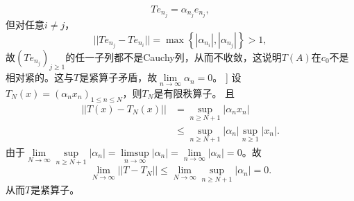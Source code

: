 \begin{enumerate}
\begin{answer}[]
      \[Te_{n_j}=\alpha_{n_j}e_{n_j},\]
      但对任意$i\not= j$，
      \[||Te_{n_j}-Te_{n_i}||=\max\left\{|\alpha_{n_i}|,|\alpha_{n_j}|\right\}>1,\]
      故$(Te_{n_j})_{j\geqslant1}$的任一子列都不是Cauchy列，从而不收敛，这说明$T(A)$在$c_0$不是相对紧的。这与$T$是紧算子矛盾，故$\lim\limits_{n\rightarrow \infty}\alpha_n=0$。 ]
      设$T_N(x)=(\alpha_n x_n)_{1\leqslant n\leqslant N}$，则$T_N$是有限秩算子。
      且
      \[\begin{aligned}
        ||T(x)-T_N(x)||&=\sup_{n\geqslant N+1}|\alpha_n x_n|\\ 
                      &\leqslant \sup_{n\geqslant N+1}|\alpha_n| \sup_{n\geqslant 1}|x_n|.
      \end{aligned}\]
      由于$\lim\limits_{N\rightarrow \infty} \sup\limits_{n\geqslant N+1}|\alpha_n|=\limsup\limits_{n\rightarrow \infty}|\alpha_n|=\lim\limits_{n\rightarrow \infty}|\alpha_n|=0$。故
      \[\lim\limits_{N\rightarrow \infty}||T-T_N||\leqslant  \lim\limits_{N\rightarrow \infty}\sup_{n\geqslant N+1}|\alpha_n|=0.\]
      从而$T$是紧算子。
    \end{answer}
\end{enumerate}